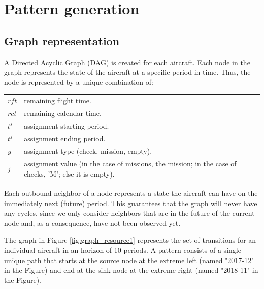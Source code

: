 \documentclass[a4paper,11pt]{article}
\begin{document}
\section{Pattern generation}

  \subsection{Graph representation}

    A Directed Acyclic Graph (DAG) is created for each aircraft. Each node in the graph represents the state of the aircraft at a specific period in time. Thus, the node is represented by a unique combination of: 

        \begin{tabular}{p{10mm}p{115mm}}
          $rft$    &  remaining flight time. \\
          $rct$    &  remaining calendar time. \\
          $t^s$    &  assignment starting period. \\
          $t^f$    &  assignment ending period. \\
          $y$      &  assignment type (check, mission, empty). \\
          $j$      &  assignment value (in the case of missions, the mission; in the case of checks, 'M'; else it is empty). \\
        \end{tabular}

    Each outbound neighbor of a node represents a state the aircraft can have on the immediately next (future) period. This guarantees that the graph will never have any cycles, since we only consider neighbors that are in the future of the current node and, as a consequence, have not been observed yet.


    The graph in Figure \ref{fig:graph_resource1} represents the set of transitions for an individual aircraft in an horizon of 10 periods. A pattern consists of a single unique path that starts at the source node at the extreme left (named "2017-12" in the Figure) and end at the sink node at the extreme right (named "2018-11" in the Figure).
\end{document}
